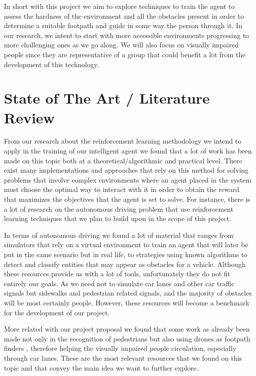 \documentclass[letterpaper,10pt]{article}
\begin{document}
In short with this project we aim to explore techniques to train the agent to 
assess the hardness of the environment and all the obstacles present in order
to determine a suitable footpath and guide in some way the person through it.
In our research, we intent to start with more accessible environments 
progressing to more challenging ones as we go along. We will also focus 
on visually impaired people since they are representative of a group that
could benefit a lot from the development of this technology.

\section{State of The Art / Literature Review}

From our research about the reinforcement learning methodology \cite{sutton}
we intend to apply in the training of our intelligent agent we found that a 
lot of work has been made on this topic both at a theoretical/algorithmic
\cite{MARL:overview,DBLP:journals/corr/abs-1911-10635}
and practical level. There exist many implementations and approaches that 
rely on this method for solving problems that involve complex environments 
where an agent placed in the system must choose the optimal way to interact with 
it in order to obtain the reward that maximizes the objectives that the agent 
is set to solve. For instance, there is a lot of research on the autonomous 
driving problem that use reinforcement learning techniques that we plan 
to build upon in the scope of this project. 

In terms of autonomous driving we found a lot of material that ranges from 
simulators \cite{duckietown-library} that rely on a virtual environment to 
train an agent that will later be put in the same scenario but in real 
life, to strategies using known algorithms \cite{vieira2021openworld} to 
detect and classify entities that may appear as obstacles for a vehicle.
Although these resources provide us with a lot of tools, unfortunately they 
do not fit entirely our goals. As we need not to simulate car lanes and 
other car traffic signals but sidewalks and pedestrian related signals, and 
the majority of obstacles will be most certainly people. However, these 
resources will become a benchmark for the development of our project.

More related with our project proposal we found that some work as already
been made not only in the recognition of pedestrians \cite{dataflair_2021}
but also using drones as footpath finders \cite{tan2021flying}, 
therefore helping the visually impaired people circulation, especially 
through car lanes. These are the most relevant resources that we found on 
this topic and that convey the main idea we want to further explore.
\end{document}

